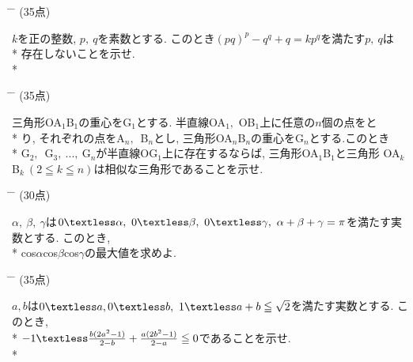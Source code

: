 \documentclass{article}
\begin{document}
\newpage
\begin{tabbing}
\hspace{0.91\textwidth} \= \hspace{0.8\textwidth} \= \kill
{}\> (35点)\>\\
\end{tabbing}
$k$を正の整数, $p,\ q$を素数とする. このとき$(pq)^p-q^q+q=kp^q$を満たす$p,\ q$は\vspace{0.1in}\\*
存在しないことを示せ.\vspace{1.0in}\\*

\begin{tabbing}
\hspace{0.91\textwidth} \= \hspace{0.8\textwidth} \= \kill
\textsf{}\> (35点)\>\\
\end{tabbing}
三角形OA$_1$B$_1$の重心をG$_1$とする. 半直線OA$_1,$ OB$_1$上に任意の$n$個の点をと\vspace{0.1in}\\* 
り, それぞれの点をA$_n,$\ B$_n$とし, 三角形OA$_n$B$_n$の重心をG$_n$とする.このとき \vspace{0.1in}\\*
G$_2,$\ G$_3,\ ...,\ $G$_n$が半直線OG$_1$上に存在するならば, 三角形OA$_1$B$_1$と三角形\vspace{0.1in}
OA$_k$B$_k\ (2\leqq k\leqq n)$は相似な三角形であることを示せ.\vspace{1.0in}\\

\begin{tabbing}
\hspace{0.91\textwidth} \= \hspace{0.8\textwidth} \= \kill
\textsf{}\> (30点)\>\\
\end{tabbing}
$\alpha,\ \beta,\ \gamma$は$0\textless\alpha,\ 0\textless\beta,\ 0\textless\gamma,\ \alpha+\beta+\gamma=\pi$を満たす実数とする. このとき,\vspace{0.1in}\\* cos$\alpha$cos$\beta$cos$\gamma$の最大値を求めよ. \vspace{1.6in}\\

\hspace{2.14in}{\Large ---$1$---}\hspace{1.3in}{\scriptsize $\diamond$ M4(738---26)}
\newpage
\begin{tabbing}
\hspace{0.91\textwidth} \= \hspace{0.8\textwidth} \= \kill
\textsf{}\> (35点)\>\\
\end{tabbing}
$a,b$は$0\textless a,0\textless b,\ 1\textless a+b\leqq \sqrt{2}$を満たす実数とする. このとき, \vspace{0.1in}\\*
$-1\textless \frac{b(2a^2-1)}{2-b}+\frac{a(2b^2-1)}{2-a}\leqq 0$であることを示せ.\vspace{1.0in}\\*
\end{document}
